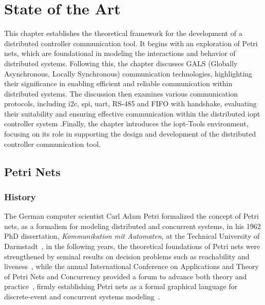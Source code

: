 
%

\chapter{State of the Art}
\label{cha:state_of_the_ art}


\epigraphfontsize{\small\itshape}
\setlength\epigraphwidth{12.5cm}
\setlength\epigraphrule{0pt}

This chapter establishes the theoretical framework for the development of a distributed controller communication tool. It begins with an exploration of Petri nets, which are foundational in modeling the interactions and behavior of distributed systems. Following this, the chapter discusses GALS (Globally Asynchronous, Locally Synchronous) communication technologies, highlighting their significance in enabling efficient and reliable communication within distributed systems. The discussion then examines various communication protocols, including \gls{i2c},  \gls{spi}, \gls{uart}, RS-485 and FIFO with handshake, evaluating their suitability and ensuring effective communication within the distributed \gls{iopt} controller system .Finally, the chapter introduces the \gls{iopt}-Tools environment, focusing on its role in supporting the design and development of the distributed controller communication tool.

\section{Petri Nets}
\label{sec:petri_nets}


\subsection{History}
\label{subsec:history}
The German computer scientist Carl Adam Petri formalized the concept of  Petri nets, as a formalism for modeling distributed and concurrent systems, in his 1962 PhD dissertation, \emph{Kommunikation mit Automaten}, at the Technical University of Darmstadt~\cite{petri1962}, in the following years, the theoretical foundations of Petri nets were strengthened by seminal results on decision problems such as reachability and liveness~\cite{murata}, while the annual International Conference on Applications and Theory of Petri Nets and Concurrency provided a forum to advance both theory and practice~\cite{ICPN1980}, firmly establishing Petri nets as a formal graphical language for discrete‐event and concurrent systems modeling~\cite{WikiPetriNet2025}.


